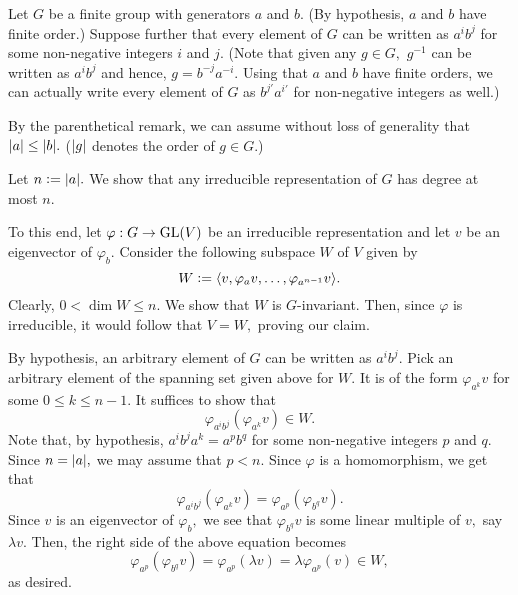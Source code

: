 \begin{ex}
	Let $G$ be a finite group with generators $a$ and $b.$ (By hypothesis, $a$ and $b$ have finite order.) Suppose further that every element of $G$ can be written as $a^ib^j$ for some non-negative integers $i$ and $j.$ (Note that given any $g \in G,$ $g^{-1}$ can be written as $a^ib^j$ and hence, $g = b^{-j}a^{-i}.$ Using that $a$ and $b$ have finite orders, we can actually write every element of $G$ as $b^{j'}a^{i'}$ for non-negative integers as well.)

	By the parenthetical remark, we can assume without loss of generality that ${\left\lvert a \right\lvert} \le {\left\lvert b \right\lvert}.$ (${\left\lvert g \right\lvert}$ denotes the order of $g \in G.$)

	Let $n \vcentcolon= {\left\lvert a \right\lvert}.$ We show that any irreducible representation of $G$ has degree at most $n.$ 

	To this end, let $\varphi : G \to \operatorname{GL}(V)$ be an irreducible representation and let $v$ be an eigenvector of $\varphi_b.$ Consider the following subspace $W$ of $V$ given by
	\begin{equation*} 
		W \vcentcolon= \langle v, \varphi_av, \ldots, \varphi_{a^{n-1}}v\rangle.
	\end{equation*}
	Clearly, $0 < \dim W \le n.$ We show that $W$ is $G$-invariant. Then, since $\varphi$ is irreducible, it would follow that $V = W,$ proving our claim.

	By hypothesis, an arbitrary element of $G$ can be written as $a^ib^j.$ Pick an arbitrary element of the spanning set given above for $W.$ It is of the form $\varphi_{a^k}v$ for some $0 \le k \le n - 1.$ It suffices to show that 
	\begin{equation*} 
		\varphi_{a^ib^j}\left(\varphi_{a^k}v\right) \in W.
	\end{equation*}
	Note that, by hypothesis, $a^ib^ja^k = a^pb^q$ for some non-negative integers $p$ and $q.$ Since $n = {\left\lvert a \right\lvert},$ we may assume that $p < n.$ Since $\varphi$ is a homomorphism, we get that
	\begin{equation*} 
		\varphi_{a^ib^j}\left(\varphi_{a^k}v\right) = \varphi_{a^p}\left(\varphi_{b^q}v\right).
	\end{equation*}
	Since $v$ is an eigenvector of $\varphi_b,$ we see that $\varphi_{b^q}v$ is some linear multiple of $v,$ say $\lambda v.$ Then, the right side of the above equation becomes
	\begin{equation*} 
		\varphi_{a^p}\left(\varphi_{b^q}v\right) = \varphi_{a^p}\left(\lambda v\right) = \lambda \varphi_{a^p}(v) \in W,
	\end{equation*}
	as desired.
\end{ex}

